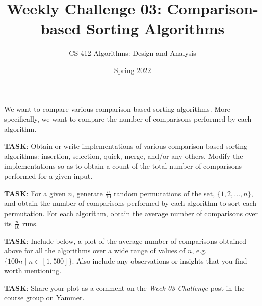 \documentclass[a4paper]{exam}
\title{Weekly Challenge 03: Comparison-based Sorting Algorithms}
\author{CS 412 Algorithms: Design and Analysis}
\date{Spring 2022}
\begin{document}
\maketitle

\begin{questions}
  
\question We want to compare various comparison-based sorting algorithms. More specifically, we want to compare the number of comparisons performed by each algorithm.

  \noindent\textbf{TASK}: Obtain or write implementations of various comparison-based sorting algorithms: insertion, selection, quick, merge, and/or any others. Modify the implementations so as to obtain a count of the total number of comparisons performed for a given input.

  \noindent\textbf{TASK}: For a given $n$, generate $\frac{n}{10}$ random permutations of the set, $\{1,2,\ldots,n\}$, and obtain the number of comparisons performed by each algorithm to sort each permutation. For each algorithm, obtain the average number of comparisons over its $\frac{n}{10}$ runs.

  \noindent\textbf{TASK}: Include below, a plot of the average number of comparisons obtained above for all the algorithms over a wide range of values of $n$, e.g. $\{100n \mid n\in [1,500] \}$. Also include any observations or insights that you find worth mentioning.

  \noindent\textbf{TASK}: Share your plot as a comment on the \textit{Week 03 Challenge} post in the course group on Yammer.

  \begin{solution}
  \end{solution}


\end{questions}
\end{document}
